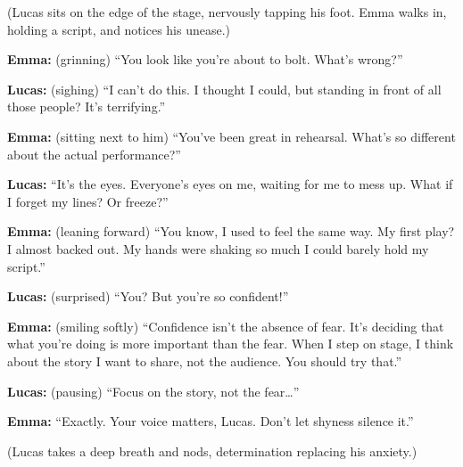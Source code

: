 \documentclass[12pt]{article}
\begin{document}
\begin{tcolorbox}[colframe=black!60, colback=white, 
coltitle=black, colbacktitle=black!15, fonttitle=\bfseries\Large, 
title=\textit{The Spotlight}, halign title=center, left=10pt, right=10pt, top=10pt, bottom=15pt]

(Lucas sits on the edge of the stage, nervously tapping his foot. Emma walks in, holding a script, and notices his unease.)

\textbf{Emma:} (grinning) “You look like you’re about to bolt. What’s wrong?”

\textbf{Lucas:} (sighing) “I can’t do this. I thought I could, but standing in front of all those people? It’s terrifying.”

\textbf{Emma:} (sitting next to him) “You’ve been great in rehearsal. What’s so different about the actual performance?”

\textbf{Lucas:} “It’s the eyes. Everyone’s eyes on me, waiting for me to mess up. What if I forget my lines? Or freeze?”

\textbf{Emma:} (leaning forward) “You know, I used to feel the same way. My first play? I almost backed out. My hands were shaking so much I could barely hold my script.”

\textbf{Lucas:} (surprised) “You? But you’re so confident!”

\textbf{Emma:} (smiling softly) “Confidence isn’t the absence of fear. It’s deciding that what you’re doing is more important than the fear. When I step on stage, I think about the story I want to share, not the audience. You should try that.”

\textbf{Lucas:} (pausing) “Focus on the story, not the fear…”

\textbf{Emma:} “Exactly. Your voice matters, Lucas. Don’t let shyness silence it.”

(Lucas takes a deep breath and nods, determination replacing his anxiety.)

 

 

 

\end{tcolorbox}

\vspace{1em}
\end{document}
